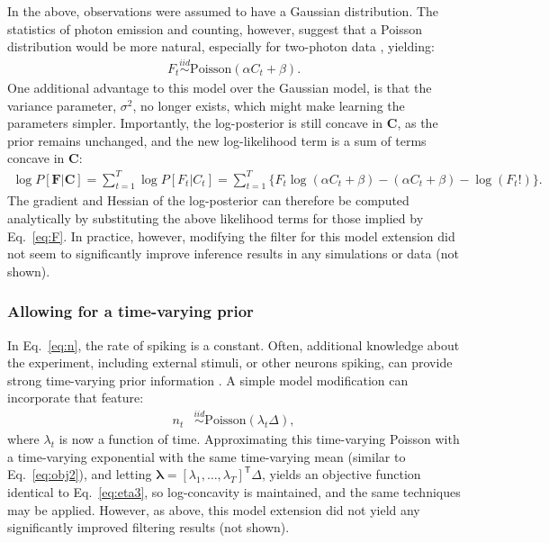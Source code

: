 \documentclass{article}
\providecommand{\ve}[1]{\boldsymbol{#1}}
\newcommand{\T}{^{\ensuremath{\mathsf{T}}}}           %
\newcommand{\bC}{\ve{C}}
\newcommand{\bF}{\ve{F}}
\newcommand{\Del}{\Delta}
\newcommand{\sig}{\sigma}
\newcommand{\lam}{\lambda}
\newcommand{\blam}{\ve{\lambda}}
\begin{document}
In the above, observations were assumed to have a Gaussian distribution.  The statistics of photon emission and counting, however, suggest that a Poisson distribution would be more natural, especially for two-photon data \cite{SjulsonMiesenbock07}, yielding:
\begin{align} \label{eq:poiss}
	F_t \overset{iid}{\sim}\text{Poisson}(\alpha C_t + \beta).
\end{align}
One additional advantage to this model over the Gaussian model, is that the variance parameter, $\sig^2$, no longer exists, which might make learning the parameters simpler.  Importantly, the log-posterior is still concave in $\bC$, as
the prior remains unchanged, and the new log-likelihood term is a sum of terms concave in $\bC$:
\begin{align}
	\log P[\bF | \bC] = \sum_{t=1}^T \log P[F_t | C_t ] = \sum_{t=1}^T \{F_t \log (\alpha C_t + \beta) -(\alpha C_t + \beta) - \log(F_t !)\}.
\end{align}
The gradient and Hessian of the log-posterior can therefore be computed analytically by substituting the above likelihood terms for those implied by Eq.~\eqref{eq:F}.  In practice, however, modifying the filter for this model extension did not seem to significantly improve inference results in any simulations or data (not shown).

\subsubsection{Allowing for a time-varying prior}

In Eq.~\eqref{eq:n}, the rate of spiking is a constant.  Often, additional knowledge about the experiment, including external stimuli, or other neurons spiking, can provide strong time-varying prior information \cite{VogelsteinPaninski09}.  A simple model modification can incorporate that feature:
\begin{align}
	n_t &\overset{iid}{\sim} \text{Poisson}(\lam_t \Del),
\end{align}
where $\lam_t$ is now a function of time.  Approximating this time-varying Poisson with a time-varying exponential with the same time-varying mean (similar to Eq.~\eqref{eq:obj2}), and letting $\blam = [\lam_1, \ldots, \lam_T]\T \Del$, yields an objective function identical to Eq.~\eqref{eq:eta3}, so log-concavity is maintained, and the same techniques may be applied.  However, as above, this model extension did not yield any significantly improved filtering results (not shown).
\end{document}
